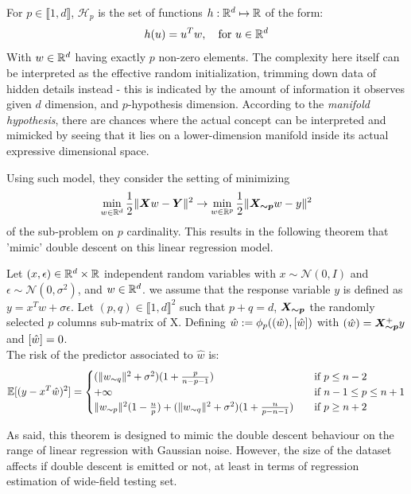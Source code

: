 \documentclass{article}
\begin{document}
\begin{definition}
For $p \in \llbracket1,d\rrbracket$, $\mathcal{H}_p$ is the set of functions $h:\mathbb{R}^d\mapsto \mathbb{R}$ of the form:
$$
h(u)=u^Tw,\quad \text{for }u \in \mathbb{R}^d
$$
With $w \in \mathbb{R}^d$ having exactly $p$ non-zero elements. The complexity here itself can be interpreted as the effective random initialization, trimming down data of hidden details instead - this is indicated by the amount of information it observes given $d$ dimension, and $p$-hypothesis dimension. According to the \textit{manifold hypothesis}, there are chances where the actual concept can be interpreted and mimicked by seeing that it lies on a lower-dimension manifold inside its actual expressive dimensional space. 
\end{definition}
Using such model, they consider the setting of minimizing
\begin{equation}
\label{eq:linear_gaussian_erm}
\min_{w\in \mathbb{R}^d} \frac{1}{2}\lVert \bm{X} w - \bm{Y} \rVert^2 \to \min_{w\in \mathbb{R}^p} \frac{1}{2}\lVert \bm{X_{\sim p}} w - y \rVert^2
\end{equation}
of the sub-problem on $p$ cardinality. This results in the following theorem that 'mimic' double descent on this linear regression model. 
\begin{theorem}
\label{thm:double_descent_lr}
Let $(x, \epsilon)\in \mathbb{R}^d\times\mathbb{R}$ independent random variables with $x \sim \mathcal{N}(0,I)$  and $\epsilon \sim \mathcal{N}(0,\sigma^2)$, and $w \in \mathbb{R}^d$. we assume that the response variable $y$ is defined as $y=x^Tw +\sigma \epsilon$. Let $(p,q) \in \llbracket 1, d\rrbracket^2$ such that $p+q=d$, $\bm{X_{\sim p}}$ the randomly selected $p$ columns sub-matrix of X. Defining $\hat w:=\phi_p(({\hat w}),[{\hat w}])$ with $({\hat w})=\bm{X_{\sim p}}^+y$ and $[{\hat w}] = 0$.\\
The risk of the predictor associated to $\hat w$ is:
$$
\mathbb{E}[(y-x^T\hat w)^2] = 
\begin{cases}
(\lVert w_{\sim q} \rVert^2+\sigma^2)(1+\frac{p}{n-p-1}) &\quad\text{if } p\leq  n-2\\
+\infty &\quad\text{if }n-1 \leq p\leq  n+1\\
\lVert w_{\sim p} \rVert^2(1-\frac{n}{p}) +  (\lVert w_{\sim q} \rVert^2+\sigma^2)(1+\frac{n}{p-n-1}) &\quad\text{if }p\geq n+2\end{cases}
$$
\end{theorem}
As said, this theorem is designed to mimic the double descent behaviour on the range of linear regression with Gaussian noise. However, the size of the dataset affects if double descent is emitted or not, at least in terms of regression estimation of wide-field testing set. 
\end{document}
